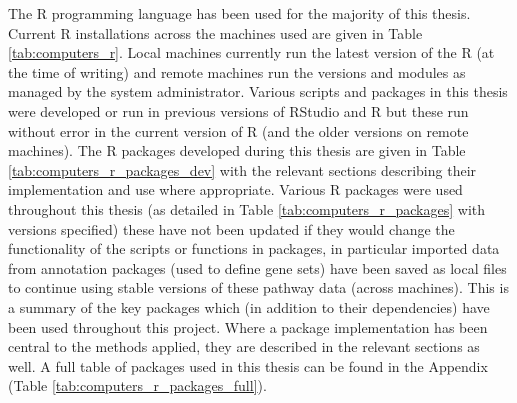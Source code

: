 The R programming language has been used for the majority of this thesis. Current R installations across the machines used are given in Table \ref{tab:computers_r}. Local machines currently run the latest version of the R (at the time of writing) and remote machines run the versions and modules as managed by the system administrator. Various scripts and packages in this thesis were developed or run in previous versions of RStudio and R but these run without error in the current version of R (and the older versions on remote machines). The R packages developed during this thesis are given in Table \ref{tab:computers_r_packages_dev} with the relevant sections describing their implementation and use where appropriate. Various R packages were used throughout this thesis (as detailed in Table \ref{tab:computers_r_packages} with versions specified) these have not been updated if they would change the functionality of the scripts or functions in packages, in particular imported data from annotation packages (used to define gene sets) have been saved as local files to continue using stable versions of these pathway data (across machines). This is a summary of the key packages which (in addition to their dependencies) have been used throughout this project. Where a package implementation has been central to the methods applied, they are described in the relevant sections as well. A full table of packages used in this thesis can be found in the Appendix (Table \ref{tab:computers_r_packages_full}).  

\setlength{\LTleft}{-20cm plus -1fill}
\setlength{\LTright}{\LTleft}

